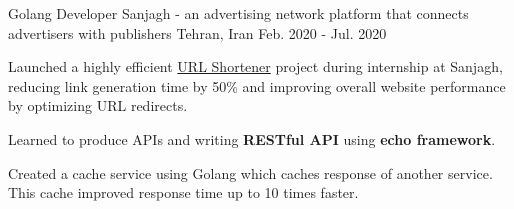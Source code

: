 \begin{cventries}
  \cventry
    {Golang Developer} %
    { Sanjagh - \textnormal{an advertising network platform that connects advertisers with publishers}} %
    {Tehran, Iran} %
    {Feb. 2020 - Jul. 2020} %
    {
      \begin{cvitems} %
        \item Launched a highly efficient \href{https://github.com/pooria1/url-shortener}{URL Shortener} project during internship at Sanjagh, reducing link generation time by 50\% and improving overall website performance by optimizing URL redirects.
        \item Learned to produce APIs and writing \textbf{RESTful API} using \textbf{echo framework}.
        \item Created a cache service using Golang which caches response of another service. This cache improved response time up to 10 times faster.
      \end{cvitems}
    }

\end{cventries}
